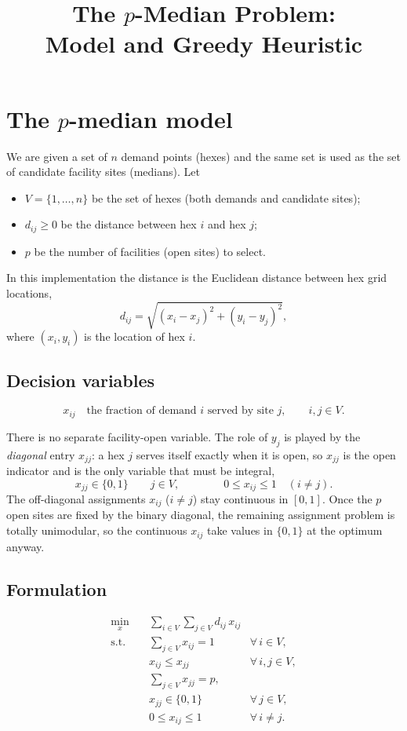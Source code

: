\documentclass[11pt]{article}
\title{The $p$-Median Problem:\\ Model and Greedy Heuristic}
\author{}
\date{}
\begin{document}
\maketitle

\section{The $p$-median model}

We are given a set of $n$ demand points (hexes) and the same set is used as the
set of candidate facility sites (medians). Let

\begin{itemize}
  \item $V = \{1, \dots, n\}$ be the set of hexes (both demands and candidate sites);
  \item $d_{ij} \ge 0$ be the distance between hex $i$ and hex $j$;
  \item $p$ be the number of facilities (open sites) to select.
\end{itemize}

In this implementation the distance is the Euclidean distance between hex grid
locations,
\[
  d_{ij} = \sqrt{(x_i - x_j)^2 + (y_i - y_j)^2},
\]
where $(x_i, y_i)$ is the location of hex $i$.

\subsection*{Decision variables}

\[
  x_{ij} \quad\text{the fraction of demand } i \text{ served by site } j,
  \qquad i, j \in V.
\]

There is no separate facility-open variable. The role of $y_j$ is played by the
\emph{diagonal} entry $x_{jj}$: a hex $j$ serves itself exactly when it is open,
so $x_{jj}$ is the open indicator and is the only variable that must be integral,
\[
  x_{jj} \in \{0, 1\} \qquad j \in V,
  \qquad\qquad
  0 \le x_{ij} \le 1 \quad (i \ne j).
\]
The off-diagonal assignments $x_{ij}$ ($i \ne j$) stay continuous in $[0,1]$.
Once the $p$ open sites are fixed by the binary diagonal, the remaining
assignment problem is totally unimodular, so the continuous $x_{ij}$ take values
in $\{0,1\}$ at the optimum anyway.

\subsection*{Formulation}

\begin{align}
  \min_{x} \quad
    & \sum_{i \in V} \sum_{j \in V} d_{ij}\, x_{ij}
      \label{eq:obj}\\
  \text{s.t.} \quad
    & \sum_{j \in V} x_{ij} = 1
      & \forall\, i \in V, \label{eq:assign}\\
    & x_{ij} \le x_{jj}
      & \forall\, i, j \in V, \label{eq:link}\\
    & \sum_{j \in V} x_{jj} = p,
      & \label{eq:count}\\
    & x_{jj} \in \{0, 1\}
      & \forall\, j \in V, \label{eq:bin}\\
    & 0 \le x_{ij} \le 1
      & \forall\, i \ne j. \label{eq:dom}
\end{align}
\end{document}
